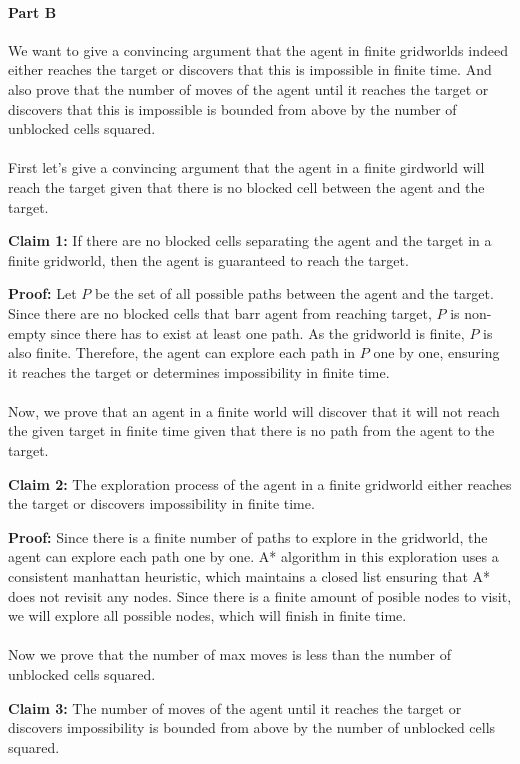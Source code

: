 \documentclass{article}
\begin{document}
\paragraph{Part B}
We want to give a convincing argument that the agent in finite gridworlds indeed either reaches the target or discovers that this is impossible in finite time. And also prove that the number of moves of the agent until it reaches the target or discovers that this is impossible is bounded from above by the number of unblocked cells squared. 
\\
\\
First let's give a convincing argument that the agent in a finite girdworld will reach the target given that there is no blocked cell between the agent and the target. 

\textbf{Claim 1:} If there are no blocked cells separating the agent and the target in a finite gridworld, then the agent is guaranteed to reach the target.

\textbf{Proof:} Let $P$ be the set of all possible paths between the agent and the target. Since there are no blocked cells that barr agent from reaching target, $P$ is non-empty since there has to exist at least one path. As the gridworld is finite, $P$ is also finite. Therefore, the agent can explore each path in $P$ one by one, ensuring it reaches the target or determines impossibility in finite time.
\\
\\
Now, we prove that an agent in a finite world will discover that it will not reach the given target in finite time given that there is no path from the agent to the target.

\textbf{Claim 2:} The exploration process of the agent in a finite gridworld either reaches the target or discovers impossibility in finite time.

\textbf{Proof:} Since there is a finite number of paths to explore in the gridworld, the agent can explore each path one by one. A* algorithm in this exploration uses a consistent manhattan heuristic, which maintains a closed list ensuring that A* does not revisit any nodes. Since there is a finite amount of posible nodes to visit, we will explore all possible nodes, which will finish in finite time.
\\
\\
Now we prove that the number of max moves is less than the number of unblocked cells squared. 

\textbf{Claim 3:} The number of moves of the agent until it reaches the target or discovers impossibility is bounded from above by the number of unblocked cells squared.
\end{document}
